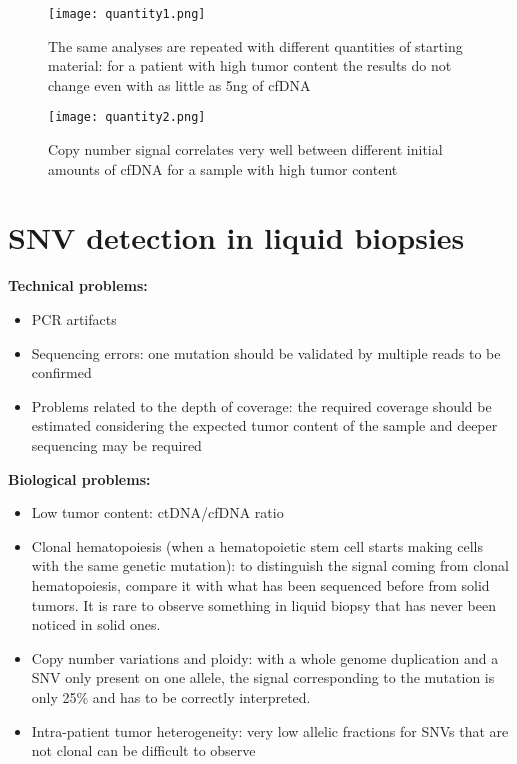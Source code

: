 \begin{figure}[H]
    \texttt{[image: quantity1.png]}
    \caption{The same analyses are repeated with different quantities of starting material: for a patient with high tumor content the results do not change even with as little as 5ng of cfDNA}
\end{figure}
%
\begin{figure}[H]
    \texttt{[image: quantity2.png]}
    \caption{Copy number signal correlates very well between different initial amounts of cfDNA for a sample with high tumor content}
\end{figure}



\section{SNV detection in liquid biopsies}

\textbf{Technical problems:}
\begin{itemize}
    \item PCR artifacts
    \item Sequencing errors: one mutation should be validated by multiple reads to be confirmed
    \item Problems related to the depth of coverage: the required coverage should be estimated considering the expected tumor content of the sample and deeper sequencing may be required
\end{itemize}
\textbf{Biological problems:}
\begin{itemize}
    \item Low tumor content: ctDNA/cfDNA ratio
    \item Clonal hematopoiesis (when a hematopoietic stem cell starts making cells with the same genetic mutation): to distinguish the signal coming from clonal hematopoiesis, compare it with what has been sequenced before from solid tumors. It is rare to observe something in liquid biopsy that has never been noticed in solid ones.
    \item Copy number variations and ploidy: with a whole genome duplication and a SNV only present on one allele, the signal corresponding to the mutation is only 25\% and has to be correctly interpreted.
    \item Intra-patient tumor heterogeneity: very low allelic fractions for SNVs that are not clonal can be difficult to observe
\end{itemize}

